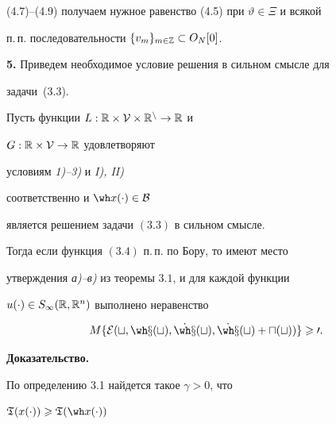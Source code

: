 (4.7)--(4.9) получаем нужное равенство (4.5) при $\vartheta\in\Xi$ и всякой


п.\,п. последовательности $\{v_m\}_{m\in{\Bbb Z}}\subset O_N[0]$.


\medskip





\addtocounter{section}{1}


\setcounter{equation}{0}


\setcounter{thms}{0}


\setcounter{lems}{0}


\setcounter{notes}{0}





{\bf 5.} Приведем необходимое условие решения в сильном смысле для


задачи~(3.3).





\begin{thms}


Пусть функции $L:\Bbb R\times\cal V\times\Bbb R^n\to\Bbb R$ и


$G:\Bbb R\times\cal V\to\Bbb R$ удовлетворяют


условиям {\em 1)--3)} и {\em I), II)}


соответственно и $\wh x(\cdot)\in\cal B$


является решением задачи $(3.3)$ в сильном смысле.


Тогда если функция $(3.4)$ п.\,п. по Бору, то имеют место


утверждения {\em а)--в)} из теоремы $3.1$, и для каждой функции


$u(\cdot)\in S_\infty(\Bbb R,\Bbb R^n)$ выполнено неравенство


\begin{equation}


M\{\cal E(t,\wh x(t),\Dot{\wh x}(t),\Dot{\wh x}(t)+u(t))\}\geqslant 0.


\end{equation}


\end{thms}





{\bf Доказательство.}


По определению 3.1 найдется такое $\gamma>0$, что


$\frak T(x(\cdot))\geqslant\frak T(\wh x(\cdot))$


